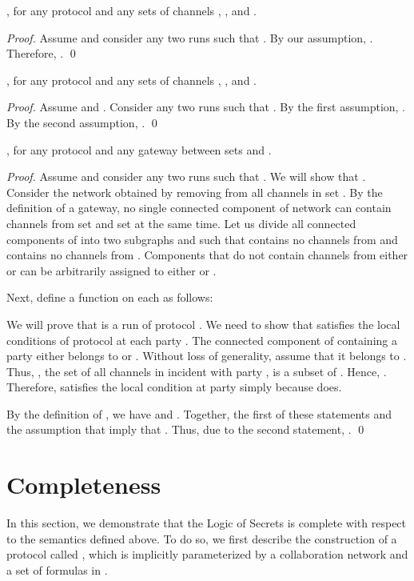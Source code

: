 \documentclass{llncs}
\begin{document}
\begin{theorem}[Augmentation]\label{}
, for any protocol  and any sets of channels , , and .
\end{theorem}
\begin{proof}
Assume  and consider any two runs  such that .
By our assumption, . Therefore, . \qed
\end{proof}

\begin{theorem}[Transitivity]\label{}
, for any protocol  and any sets of channels , , and .
\end{theorem}
\begin{proof}
Assume  and . Consider any two runs  such that .
By the first assumption, . By the second assumption, . \qed
\end{proof}

\begin{theorem}[Gateway]\label{}
, for any protocol  and any gateway  between sets  and .
\end{theorem}
\begin{proof}
Assume  and consider any two runs  such that . We will show that .
Consider the network  obtained by removing from  all channels in set . By the definition of a gateway, no single connected component of network  can contain channels from set  and set  at the same time. Let us divide all connected components of  into two subgraphs  and  such that  contains no channels from  and  contains no channels from . Components that do not contain channels from either  or  can be arbitrarily assigned to either  or .

Next, define a function  on each  as follows:

We will prove that  is a run of protocol . We need to show that  satisfies the local conditions of protocol  at each party . The connected component of  containing a party  either belongs to  or . Without loss of generality, assume that it belongs to . Thus, , the set of all channels in  incident with party , is a subset of . Hence, . Therefore,  satisfies the local condition at party  simply because  does.

By the definition of , we have  and . Together, the first of these statements and the assumption that  imply that . Thus, due to the second statement, . \qed

\end{proof}





\section{Completeness}
In this section, we demonstrate that the Logic of Secrets is complete with respect to the semantics defined above.  To do so, we first describe the construction of a protocol called , which is implicitly parameterized by a collaboration network  and a set  of formulas in .
\end{document}

